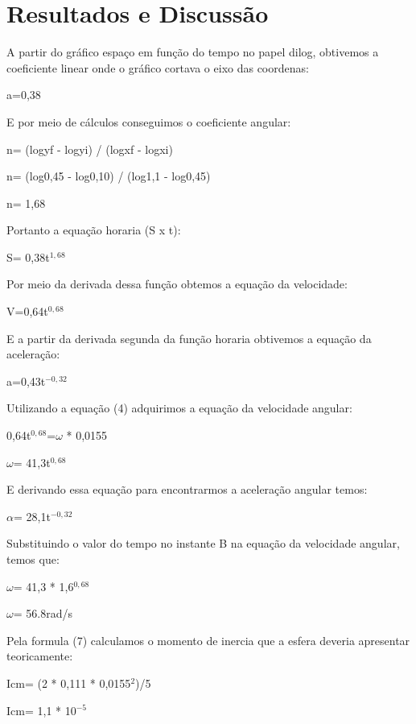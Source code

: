 \documentclass[
	12pt,				%
	oneside,			%
	a4paper,			%
	english,			%
	french,				%
	spanish,			%
	brazil,				%
	]{abntex2}
\begin{document}

\newpage
\section[Resultados e Discussão]{Resultados e Discussão}
\pagestyle{fancy}
A partir do gráfico espaço em função do tempo no papel dilog, obtivemos a coeficiente linear onde o gráfico cortava o eixo das coordenas: 

a=0,38
 
E por meio de cálculos conseguimos o coeficiente angular:

n= (logyf  - logyi) / (logxf  - logxi)

n= (log0,45 - log0,10) / (log1,1 - log0,45)

n= 1,68

Portanto a equação horaria (S x t): 

S= 0,38t$^{1,68}$

Por meio da derivada dessa função obtemos a equação da velocidade:

V=0,64t$^{0,68}$

E a partir da derivada segunda da função horaria obtivemos a equação da aceleração:

a=0,43t$^{-0,32}$

Utilizando a equação (4) adquirimos a equação da velocidade angular:

0,64t$^{0,68}$=$\omega$ * 0,0155

$\omega$= 41,3t$^{0,68}$

E derivando essa equação para encontrarmos a aceleração angular temos:

$\alpha$= 28,1t$^{-0,32}$

Substituindo o valor do tempo no instante B na equação da velocidade angular, temos que:

$\omega$= 41,3 * 1,6$^{0,68}$

$\omega$= 56.8rad/s

Pela formula (7) calculamos o momento de inercia que a esfera deveria apresentar teoricamente:

Icm= (2 * 0,111 * 0,0155$^{2}$)/5

Icm= 1,1 * 10$^{-5}$
\end{document}
